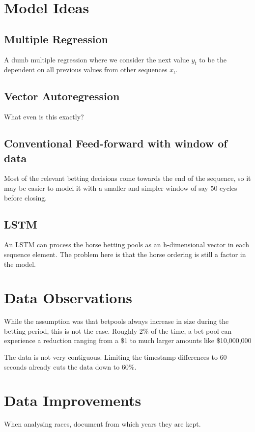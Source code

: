 \section{Model Ideas}

\subsection{Multiple Regression}
A dumb multiple regression where we consider the next value $y_t$ to be the dependent on all previous values from other
sequences $x_t$.

\subsection{Vector Autoregression}
What even is this exactly?

\subsection{Conventional Feed-forward with window of data}
Most of the relevant betting decisions come towards the end of the sequence, so it may be easier to model it with a
smaller and simpler window of say 50 cycles before closing.

\subsection{LSTM}
An LSTM can process the horse betting pools as an h-dimensional vector in each sequence element.
The problem here is that the horse ordering is still a factor in the model.

\section{Data Observations}
While the assumption was that betpools always increase in size during the betting period, this is not the case. Roughly
2\% of the time, a bet pool can experience a reduction ranging from a \$1 to much larger amounts like \$10,000,000

The data is not very contiguous. Limiting the timestamp differences to 60 seconds already cuts the data down to 60\%.

\section{Data Improvements}
When analysing races, document from which years they are kept.
